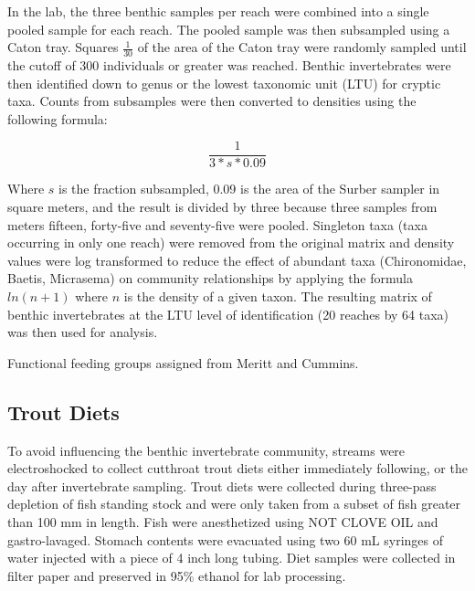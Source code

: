 \documentclass[double,12pt]{beavtex}
\begin{document}
  In the lab, the three benthic samples per reach were combined into a
  single pooled sample for each reach. The pooled sample was then
  subsampled using a Caton tray. Squares \(\frac{1} {30}\) of the area of
  the Caton tray were randomly sampled until the cutoff of 300 individuals
  or greater was reached. Benthic invertebrates were then identified down
  to genus or the lowest taxonomic unit (LTU) for cryptic taxa. Counts
  from subsamples were then converted to densities using the following
  formula:
  
  \begin{equation}
  \frac{1}{3*s*0.09}
  \end{equation}
  
  Where \(s\) is the fraction subsampled, 0.09 is the area of the Surber
  sampler in square meters, and the result is divided by three because
  three samples from meters fifteen, forty-five and seventy-five were
  pooled. Singleton taxa (taxa occurring in only one reach) were removed
  from the original matrix and density values were log transformed to
  reduce the effect of abundant taxa (Chironomidae, Baetis, Micrasema) on
  community relationships by applying the formula \(ln(n + 1)\) where
  \(n\) is the density of a given taxon. The resulting matrix of benthic
  invertebrates at the LTU level of identification (20 reaches by 64 taxa)
  was then used for analysis.
  
  Functional feeding groups assigned from Meritt and Cummins.
  
  \subsection*{Trout Diets}\label{trout-diets}
  
  To avoid influencing the benthic invertebrate community, streams were
  electroshocked to collect cutthroat trout diets either immediately
  following, or the day after invertebrate sampling. Trout diets were
  collected during three-pass depletion of fish standing stock and were
  only taken from a subset of fish greater than 100 mm in length. Fish
  were anesthetized using NOT CLOVE OIL and gastro-lavaged. Stomach
  contents were evacuated using two 60 mL syringes of water injected with
  a piece of 4 inch long tubing. Diet samples were collected in filter
  paper and preserved in 95\% ethanol for lab processing.
  
\end{document}
